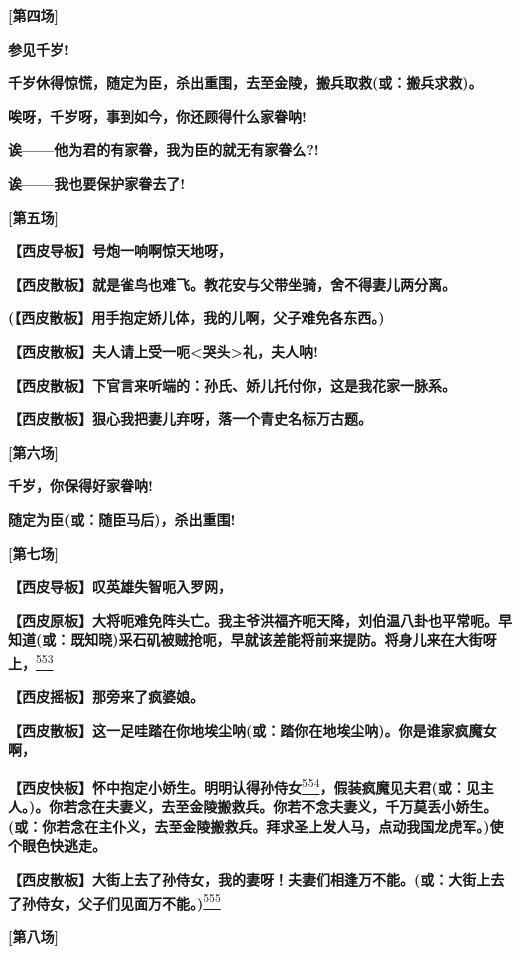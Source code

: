 \textbf{{[}第四场{]}}

\textbf{参见千岁!}

\textbf{千岁休得惊慌，随定为臣，杀出重围，去至金陵，搬兵取救(或：搬兵求救)。}

\textbf{唉呀，千岁呀，事到如今，你还顾得什么家眷呐!}

\textbf{诶------他为君的有家眷，我为臣的就无有家眷么?!}

\textbf{诶------我也要保护家眷去了!}

\textbf{{[}第五场{]}}

\textbf{【西皮导板】号炮一响啊惊天地呀，}

\textbf{【西皮散板】就是雀鸟也难飞。教花安与父带坐骑，舍不得妻儿两分离。}

\textbf{(【西皮散板】用手抱定娇儿体，我的儿啊，父子难免各东西。)}

\textbf{【西皮散板】夫人请上受一呃\textless{}哭头\textgreater{}礼，夫人呐!}

\textbf{【西皮散板】下官言来听端的：孙氏、娇儿托付你，这是我花家一脉系。}

\textbf{【西皮散板】狠心我把妻儿弃呀，落一个青史名标万古题。}

\textbf{{[}第六场{]}}

\textbf{千岁，你保得好家眷呐!}

\textbf{随定为臣(或：随臣马后)，杀出重围!}

\textbf{{[}第七场{]}}

\textbf{【西皮导板】叹英雄失智呃入罗网，}

\textbf{【西皮原板】大将呃难免阵头亡。我主爷洪福齐呃天降，刘伯温八卦也平常呃。早知道(或：既知晓)采石矶被贼抢呃，早就该差能将前来提防。将身儿来在大街呀上，}\protect\hyperlink{fn553}{\textsuperscript{553}}

\textbf{【西皮摇板】那旁来了疯婆娘。}

\textbf{【西皮散板】这一足哇踏在你地埃尘呐(或：踏你在地埃尘呐)。你是谁家疯魔女啊，}

\textbf{【西皮快板】怀中抱定小娇生。明明认得孙侍女}\protect\hyperlink{fn554}{\textsuperscript{554}}\textbf{，假装疯魔见夫君(或：见主人。)。你若念在夫妻义，去至金陵搬救兵。你若不念夫妻义，千万莫丢小娇生。(或：你若念在主仆义，去至金陵搬救兵。拜求圣上发人马，点动我国龙虎军。)使个眼色快逃走。}

\textbf{【西皮散板】大街上去了孙侍女，我的妻呀！夫妻们相逢万不能。(或：大街上去了孙侍女，父子们见面万不能。)}\protect\hyperlink{fn555}{\textsuperscript{555}}

\textbf{{[}第八场{]}}

